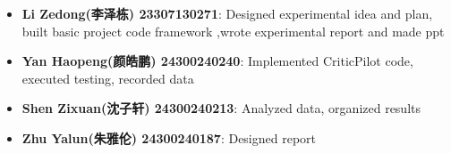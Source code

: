 \documentclass[UTF8]{article} %
\begin{document}
\begin{itemize}
\item
  \textbf{Li Zedong(李泽栋) 23307130271}: Designed experimental idea and
  plan, built basic project code framework ,wrote
  experimental report and made ppt
\item
  \textbf{Yan Haopeng(颜皓鹏) 24300240240}: Implemented CriticPilot
  code, executed testing, recorded data
\item
  \textbf{Shen Zixuan(沈子轩) 24300240213}: Analyzed data, organized
  results
\item
  \textbf{Zhu Yalun(朱雅伦) 24300240187}: Designed report
\end{itemize}
\end{document}
